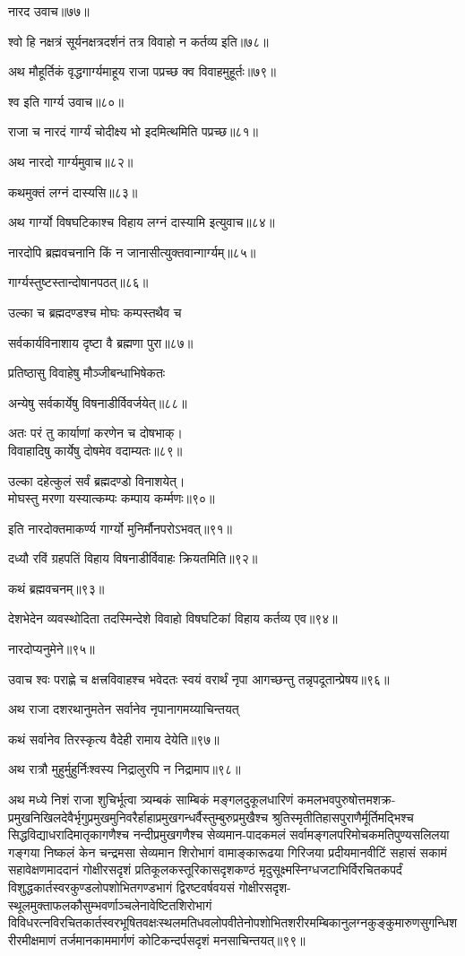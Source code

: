 \begin{flushleft}
नारद उवाच॥७७॥

श्वो हि नक्षत्रं सूर्यनक्षत्रदर्शनं तत्र विवाहो न कर्तव्य इति॥७८॥

अथ मौहूर्तिकं वृद्धगार्ग्यमाहूय राजा पप्रच्छ क्व विवाहमुहूर्तः॥७९॥

श्व इति गार्ग्य उवाच॥८०॥

राजा च नारदं गार्ग्यं चोदीक्ष्य भो इदमित्थमिति पप्रच्छ॥८१॥

अथ नारदो गार्ग्यमुवाच॥८२॥

कथमुक्तं लग्नं दास्यसि॥८३॥

अथ गार्ग्यो विषघटिकाश्च विहाय लग्नं दास्यामि इत्युवाच॥८४॥

नारदोपि ब्रह्मवचनानि किं न जानासीत्युक्तवान्गार्ग्यम्॥८५॥

गार्ग्यस्तुष्टस्तान्दोषानपठत्॥८६॥

उल्का च ब्रह्मदण्डश्च मोघः कम्पस्तथैव च

सर्वकार्यविनाशाय दृष्टा वै ब्रह्मणा पुरा॥८७॥

प्रतिष्ठासु विवाहेषु मौञ्जीबन्धाभिषेकतः

अन्येषु सर्वकार्येषु विषनाडीर्विवर्जयेत्॥८८॥

अतः परं तु कार्याणां करणेन च दोषभाक्।\\
विवाहादिषु कार्येषु दोषमेव वदाम्यतः॥८९॥

उल्का दहेत्कुलं सर्वं ब्रह्मदण्डो विनाशयेत्।\\
मोघस्तु मरणा यस्यात्कम्पः कम्पाय कर्म्मणः॥९०॥

इति नारदोक्तमाकर्ण्य गार्ग्यो मुनिर्मौनपरोऽभवत्॥९१॥

दध्यौ रविं ग्रहपतिं विहाय विषनाडीर्विवाहः क्रियतमिति॥९२॥


कथं ब्रह्मवचनम्॥९३॥


देशभेदेन व्यवस्थोदिता तदस्मिन्देशे विवाहो विषघटिकां विहाय कर्तव्य एव॥९४॥

नारदोप्यनुमेने॥९५॥

उवाच श्वः पराह्णे च क्षत्त्रविवाहश्च भवेदतः स्वयं वरार्थं नृपा आगच्छन्तु तन्नृपदूतान्प्रेषय॥९६॥

अथ राजा दशरथानुमतेन सर्वानेव नृपानागमय्याचिन्तयत्

कथं सर्वानेव तिरस्कृत्य वैदेही रामाय देयेति॥९७॥

अथ रात्रौ मुहुर्मुहुर्निःश्वस्य निद्रालुरपि न निद्रामाप॥९८॥

अथ मध्ये निशं राजा शुचिर्भूत्वा त्र्यम्बकं साम्बिकं मङ्गलदुकूलधारिणं कमलभवपुरुषोत्तमशक्र-प्रमुखनिखिलदेवैर्भृगुप्रमुखमुनिवरैर्हाहाप्रमुखगन्धर्वैस्तुम्बुरुप्रमुखैश्च श्रुतिस्मृतीतिहासपुराणैर्मूर्तिमद्भिश्च सिद्धविद्याधरादिमातृकागणैश्च नन्दीप्रमुखगणैश्च सेव्यमान-पादकमलं सर्वामङ्गलपरिमोचकमतिपुण्यसलिलया गङ्गया निष्कलं केन चन्द्रमसा सेव्यमान शिरोभागं वामाङ्कारूढया गिरिजया प्रदीयमानवीटिं सहासं सकामं सहावेक्षणमाददानं गोक्षीरसदृशं प्रतिकूलकस्तूरिकासदृशकण्ठं मृदुसूक्ष्मस्निग्धजटाभिर्विरचितकपर्दं विशुद्धकार्तस्वरकुण्डलोपशोभितगण्डभागं द्विरष्टवर्षवयसं गोक्षीरसदृश-स्थूलमुक्ताफलकौसुम्भवर्णाञ्चलेनावेष्टितशिरोभागं विविधरत्नविरचितकार्तस्वरभूषितवक्षःस्थलमतिधवलोपवीतेनोपशोभितशरीरमम्बिकानुलग्नकुङ्कुमारुणसुगन्धिशरीरमीक्षमाणं तर्जमानकाममार्गणं कोटिकन्दर्पसदृशं मनसाचिन्तयत्॥९९॥


\end{flushleft}
